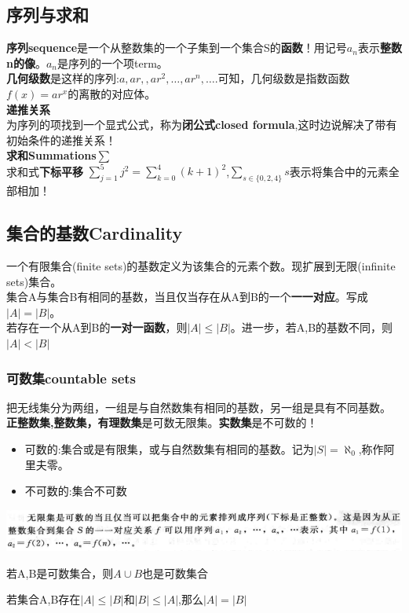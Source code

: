 \documentclass{article}
\begin{document}
    \subsection{序列与求和}
    \textbf{序列sequence}是一个从整数集的一个子集到一个集合S的\textbf{函数}！用记号$a_n$表示\textbf{整数n的像}。$a_n$是序列的一个项term。
    \\
    \textbf{几何级数}是这样的序列:\quad $a, ar, ,ar^2, \dots, ar^n, \dots$.\quad 可知，几何级数是指数函数$f(x)=ar^x$的离散的对应体。
    \\
    \textbf{递推关系}\\
    为序列的项找到一个显式公式，称为\textbf{闭公式closed formula},这时边说解决了带有初始条件的递推关系！
    \\
    \textbf{求和Summations}$\sum$\\
    求和式\textbf{下标平移} $\sum_{j=1}^{5}j^2 = \sum_{k=0}^{4}(k+1)^2$,\quad $\sum_{s\in \{0,2,4\}}s$表示将集合中的元素全部相加！
    \\
    \subsection{集合的基数Cardinality}
    一个有限集合(finite sets)的基数定义为该集合的元素个数。现扩展到无限(infinite sets)集合。\\
    集合A与集合B有相同的基数，当且仅当存在从A到B的一个\textbf{一一对应}。写成$|A|=|B|$。\\
    若存在一个从A到B的\textbf{一对一函数}，则$|A| \leqslant|B|$。进一步，若A,B的基数不同，则$|A| < |B|$
    \subsubsection{可数集countable sets}
    把无线集分为两组，一组是与自然数集有相同的基数，另一组是具有不同基数。\\
    \textbf{正整数集,整数集，有理数集}是可数无限集。\textbf{实数集}是不可数的！
    \begin{itemize}
        \item 可数的:集合或是有限集，或与自然数集有相同的基数。记为$|S| = \aleph_0$,称作阿里夫零。
        \item 不可数的:集合不可数
    \end{itemize}
    \includegraphics[width=1.20\textwidth]{2019-07-23_11-49.png}
    \begin{theorem}
        若A,B是可数集合，则$A\cup B$也是可数集合
    \end{theorem}
    \begin{theorem}
    若集合A,B存在$|A| \leqslant|B|$和$|B| \leqslant|A|$,那么$|A|=|B|$
    \end{theorem}
\end{document}
